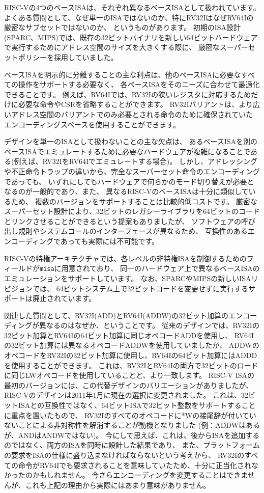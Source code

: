 \begin{commentary}
RISC-Vの4つのベースISAは、それぞれ異なるベースISAとして扱われています。
よくある質問として、なぜ単一のISAではないのか、特にRV32IはなぜRV64Iの厳密なサブセットではないのか、
というものがあります。 
初期のISA設計(SPARC、MIPS)では、既存の32ビットバイナリを新しい64ビットハードウェアで実行するためにアドレス空間のサイズを大きくする際に、
厳密なスーパーセットポリシーを採用していました。

ベースISAを明示的に分離することの主な利点は、他のベースISAに必要なすべての操作をサポートする必要なく、
各ベースISAをそのニーズに合わせて最適化できることです。
例えば、RV64Iでは、RV32Iの狭いレジスタに対応するためだけに必要な命令やCSRを省略することができます。
RV32Iバリアントは、より広いアドレス空間のバリアントでのみ必要とされる命令のために確保されていた
エンコーディングスペースを使用することができます。

デザインを単一のISAとして扱わないことの主な欠点は、
あるベースISAを別のベースISAでエミュレートするために必要なハードウェアが複雑になることである(例えば、RV32IをRV64Iでエミュレートする場合)。
しかし、アドレッシングや不正命令トラップの違いから、完全なスーパーセット命令のエンコーディングであっても、
いずれにしてもハードウェアで何らかのモード切り替えが必要となるのが一般的であり、また、
異なるRISC-VのベースISAは十分に類似しているため、
複数のバージョンをサポートすることは比較的低コストです。
厳密なスーパーセット設計により、32ビットのレガシーライブラリを64ビットのコードとリンクさせることができるという提案もありましたが、
ソフトウェアの呼び出し規則やシステムコールのインターフェースが異なるため、
互換性のあるエンコーディングであっても実際には不可能です。

RISC-Vの特権アーキテクチャでは、各レベルの非特権ISAを制御するためのフィールドが{\tt misa}に用意されており、
同一のハードウェア上で異なるベースISAのエミュレーションをサポートしています。 
なお、SPARCやMIPSの新しいISAリビジョンでは、
64ビットシステム上で32ビットコードを変更せずに実行するサポートは廃止されています。

関連した質問として、RV32I(ADD)とRV64I(ADDW)の32ビット加算のエンコーディングが異なるのはなぜか、ということです。
従来のデザインでは、RV32Iの32ビット加算とRV64Iの64ビット加算に同じオペコードADDを使用し、
RV64Iの32ビット加算には異なるオペコードADDWを使用していましたが、
ADDWのオペコードをRV32Iの32ビット加算に使用し、RV64Iの64ビット加算にはADDDを使用することができます。
これは、RV32IとRV64Iの両方で32ビットのロードに同じLWオペコードを使用していることと、より一致します。
RISC-V ISAの最初のバージョンには、この代替デザインのバリエーションがありましたが、RISC-Vのデザインは2011年1月に現在の選択に変更されました。
これは、32ビットISAとの互換性ではなく、64ビットISAで32ビット整数をサポートすることに重点を置いたもので、
RV32Iのすべてのオペコードに*Wの接尾辞が付いていないことによる非対称性を解消することが動機となりました
(例：ADDWはあるが、ANDはANDWではない)。 
今にして思えば、これは、後からISAを追加するのではなく、両方のISAを同時に設計した結果であり、
また、プラットフォームの要求をISAの仕様に盛り込まなければならないという考えから、
RV32Iのすべての命令がRV64Iでも要求されることを意味していたため、十分に正当化されなかったのかもしれません。
今さらエンコーディングを変更することはできませんが、これも上記の理由から実際にはあまり意味がありません。


\end{commentary}
